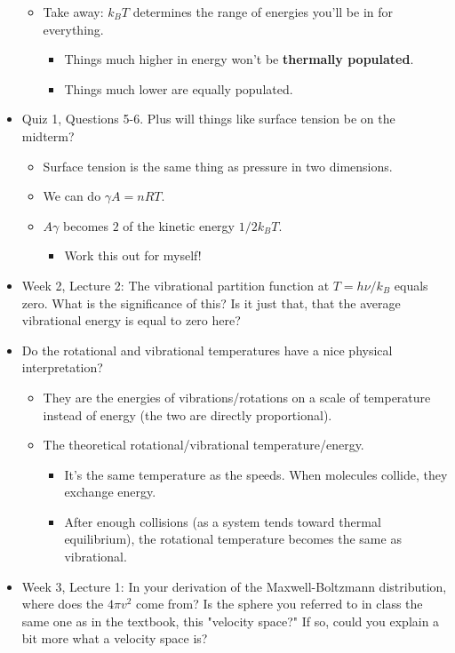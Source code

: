 \documentclass[../notes.tex]{subfiles}
\begin{document}
\begin{itemize}
\begin{itemize}
        \item Take away: $k_BT$ determines the range of energies you'll be in for everything.
        \begin{itemize}
            \item Things much higher in energy won't be \textbf{thermally populated}.
            \item Things much lower are equally populated.
        \end{itemize}
    \end{itemize}
    \item Quiz 1, Questions 5-6. Plus will things like surface tension be on the midterm?
    \begin{itemize}
        \item Surface tension is the same thing as pressure in two dimensions.
        \item We can do $\gamma A=nRT$.
        \item $A\gamma$ becomes $2$ of the kinetic energy $1/2k_BT$.
        \begin{itemize}
            \item Work this out for myself!
        \end{itemize}
    \end{itemize}
    \item Week 2, Lecture 2: The vibrational partition function at $T=h\nu/k_B$ equals zero. What is the significance of this? Is it just that, that the average vibrational energy is equal to zero here?
    \item Do the rotational and vibrational temperatures have a nice physical interpretation?
    \begin{itemize}
        \item They are the energies of vibrations/rotations on a scale of temperature instead of energy (the two are directly proportional).
        \item The theoretical rotational/vibrational temperature/energy.
        \begin{itemize}
            \item It's the same temperature as the speeds. When molecules collide, they exchange energy.
            \item After enough collisions (as a system tends toward thermal equilibrium), the rotational temperature becomes the same as vibrational.
        \end{itemize}
    \end{itemize}
    \item Week 3, Lecture 1: In your derivation of the Maxwell-Boltzmann distribution, where does the $4\pi v^2$ come from? Is the sphere you referred to in class the same one as in the textbook, this "velocity space?" If so, could you explain a bit more what a velocity space is?

\end{itemize}
\end{document}

